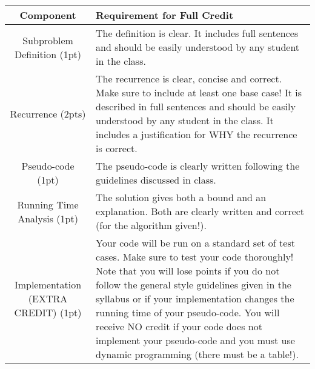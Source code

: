 \documentclass[11pt]{exam}
\begin{document}
\begin{center}
  \begin{tabular}{| c | p{10cm} |}
	\hline
	Component & Requirement for Full Credit\\
    \hline
    Subproblem Definition  (1pt) & The definition is clear.  It includes full sentences and should be easily understood by any student in the class. \\ \hline
  Recurrence  (2pts) & The recurrence is clear, concise and correct.  Make sure to include at least one base case!  It is described in full sentences and should be easily understood by any student in the class. It includes a justification for WHY the recurrence is correct. \\ \hline
	Pseudo-code  (1pt) & The pseudo-code is clearly written following the guidelines discussed in class.\\ \hline
	Running Time Analysis  (1pt) & The solution gives both a bound and an explanation.  Both are clearly written and correct (for the algorithm given!).  \\ \hline
  Implementation (EXTRA CREDIT) (1pt) & Your code will be run on a standard set of test cases.  Make sure to test your code thoroughly!  Note that you will lose points if you do not follow the general style guidelines given in the syllabus or if your implementation changes the running time of your pseudo-code.  You will receive NO credit if your code does not implement your pseudo-code and you must use dynamic programming (there must be a table!).  \\ \hline
		
  \end{tabular}
\end{center}
   \\
   
\end{document}
